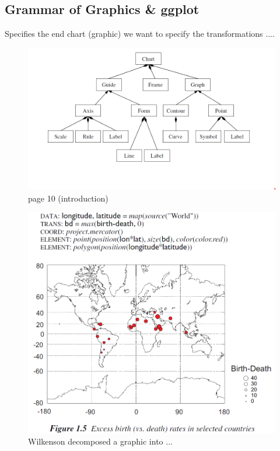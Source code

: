 \documentclass[letterpaper,onecolumn,titlepage]{Ythesis}
\begin{document}
\subsection{Grammar of Graphics \& ggplot}
Specifies the end chart (graphic)
we want to specify the transformations ....
\begin{figure}
    \includegraphics{figures/intro/grammar_chart_composition.png}
    \caption{page 10 (introduction)}
\end{figure}

\begin{figure}
    \includegraphics{figures/intro/grammar_example.png}
    \caption{Wilkenson decomposed a graphic into ...} 
\end{figure}
\end{document}
